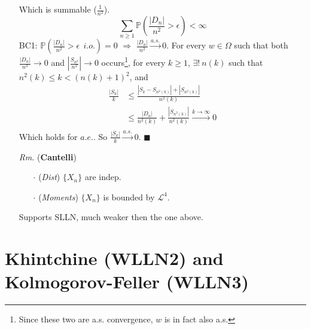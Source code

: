 \documentclass[a4paper,12pt,twoside]{book}
\begin{document}
\begin{itemize}
\begin{equation}
	\end{equation}
	Which is summable ($\frac{1}{n^2}$).
	\begin{equation}
		\sum_{n\geq 1} \mathbb{P}\left(\frac{|D_n|}{n^2}>\epsilon\right)<\infty
	\end{equation}
	BC1: $\mathbb{P}\left(\frac{|D_n|}{n^2}>\epsilon~~i.o.\right)=0$ $\Rightarrow$ $\frac{|D_n|}{n^2} \xrightarrow{a.s.} 0$. \newline
	For every $w\in \Omega$ such that both $\frac{|D_n|}{n^2} \to 0$ and $\left|\frac{S_{n^2}}{n^2}\right| \to 0$ occurs\footnote{Since these two are a.s. convergence, $w$ is in fact also a.s.}, for every $k\geq 1$, $\exists!~n(k)$ such that $n^2(k)\leq k < (n(k)+1)^2$, and
	\begin{equation}
		\begin{split}
			\frac{|S_k|}{k}&\leq\frac{|S_k-S_{n^2(k)}|+|S_{n^2(k)}|}{n^2(k)}\\
			&\leq \frac{|D_n|}{n^2(k)} + \frac{|S_{n^2(k)}|}{n^2(k)}\xrightarrow{k\to \infty}0\\
		\end{split}
	\end{equation}
	Which holds for $a.e.$. So $\frac{|S_k|}{k}\xrightarrow{a.s.}0$. $\blacksquare$


	\item[\textit{Rm.}] (\textbf{Cantelli})
	\begin{itemize}
		\item[$\cdot$] (\textit{Dist}) $\{X_n\}$ are indep.
		\item[$\cdot$] (\textit{Moments}) $\{X_n\}$ is bounded by $\mathcal{L}^4$.
	\end{itemize}
	Supports SLLN, much weaker then the one above.
\end{itemize}



\section{Khintchine (WLLN2) and Kolmogorov-Feller (WLLN3)}

\end{document}
